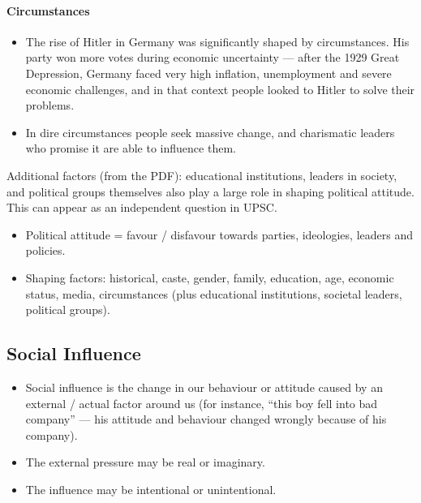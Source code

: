 \paragraph{Circumstances}

\begin{ExampleBox}
\begin{itemize}
\item The rise of Hitler in Germany was significantly shaped by circumstances. His party won more votes during economic uncertainty --- after the 1929 Great Depression, Germany faced very high inflation, unemployment and severe economic challenges, and in that context people looked to Hitler to solve their problems.
\item In dire circumstances people seek massive change, and charismatic leaders who promise it are able to influence them.
\end{itemize}
\end{ExampleBox}

Additional factors (from the PDF): educational institutions, leaders in society, and political groups themselves also play a large role in shaping political attitude. This can appear as an independent question in UPSC.

\begin{QuickRevision}
\begin{itemize}
\item Political attitude = favour / disfavour towards parties, ideologies, leaders and policies.
\item Shaping factors: historical, caste, gender, family, education, age, economic status, media, circumstances (plus educational institutions, societal leaders, political groups).
\end{itemize}
\end{QuickRevision}

\subsection{Social Influence}

\begin{KeyConcept}
\begin{itemize}
\item Social influence is the change in our behaviour or attitude caused by an external / actual factor around us (for instance, ``this boy fell into bad company'' --- his attitude and behaviour changed wrongly because of his company).
\item The external pressure may be real or imaginary.
\item The influence may be intentional or unintentional.
\end{itemize}
\end{KeyConcept}

